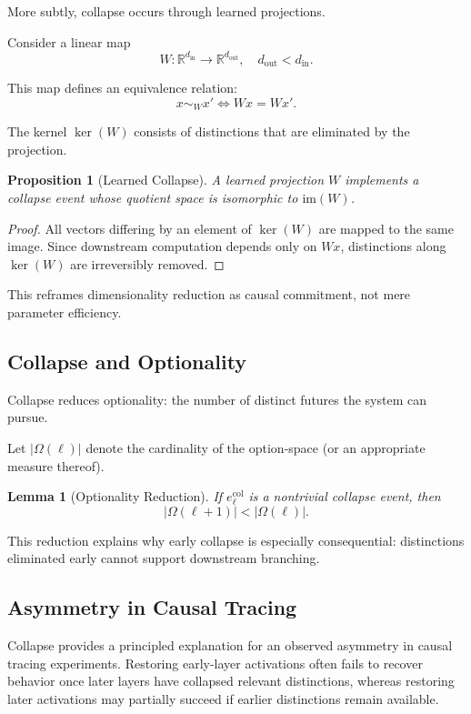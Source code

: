 \documentclass[11pt]{article}
\newtheorem{lemma}{Lemma}
\newtheorem{proposition}{Proposition}
\theoremstyle{remark}
\begin{document}
More subtly, collapse occurs through learned projections.

Consider a linear map
\[
W : \mathbb{R}^{d_{\text{in}}} \to \mathbb{R}^{d_{\text{out}}},
\quad d_{\text{out}} < d_{\text{in}}.
\]

This map defines an equivalence relation:
\[
x \sim_W x' \iff Wx = Wx'.
\]

The kernel $\ker(W)$ consists of distinctions that are eliminated by the
projection.

\begin{proposition}[Learned Collapse]
A learned projection $W$ implements a collapse event whose quotient
space is isomorphic to $\mathrm{im}(W)$.
\end{proposition}

\begin{proof}
All vectors differing by an element of $\ker(W)$ are mapped to the same
image. Since downstream computation depends only on $Wx$, distinctions
along $\ker(W)$ are irreversibly removed.
\end{proof}

This reframes dimensionality reduction as causal commitment, not mere
parameter efficiency.

\subsection{Collapse and Optionality}

Collapse reduces optionality: the number of distinct futures the system
can pursue.

Let $|\Omega(\ell)|$ denote the cardinality of the option-space (or an
appropriate measure thereof).

\begin{lemma}[Optionality Reduction]
If $e^{\mathrm{col}}_\ell$ is a nontrivial collapse event, then
\[
|\Omega(\ell+1)| < |\Omega(\ell)|.
\]
\end{lemma}

This reduction explains why early collapse is especially consequential:
distinctions eliminated early cannot support downstream branching.

\subsection{Asymmetry in Causal Tracing}

Collapse provides a principled explanation for an observed asymmetry in
causal tracing experiments. Restoring early-layer activations often
fails to recover behavior once later layers have collapsed relevant
distinctions, whereas restoring later activations may partially succeed
if earlier distinctions remain available.
\end{document}
